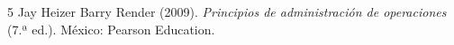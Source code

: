 \documentclass[../main]{subfiles}
\begin{document}
\begin{thebibliography}{5}
  Jay Heizer Barry Render (2009).
  \textit{Principios de administración de operaciones} (7.ª ed.).
  México: Pearson Education.
\end{thebibliography}
\end{document}
